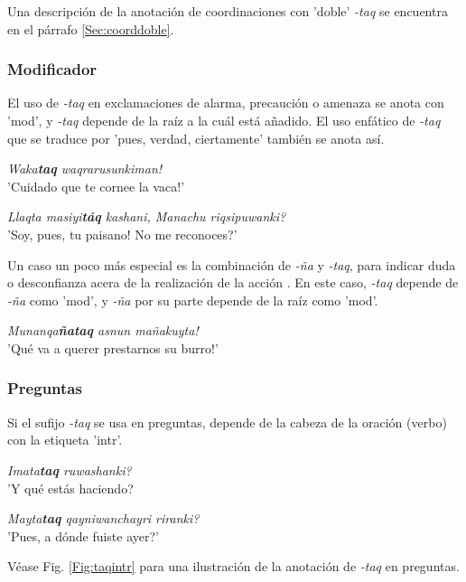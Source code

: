 \documentclass[a4paper,11pt,DIV12]{scrartcl}
\begin{document}
Una descripci\'on de la anotaci\'on de coordinaciones con 'doble' {\em -taq} se encuentra en el p\'arrafo \ref{Sec:coorddoble}.

\subsubsection{Modificador}\label{Sec:taqmod}
El uso de {\em -taq} en exclamaciones de alarma, precauci\'on o amenaza se anota con 'mod', y {\em -taq} depende de la ra\'iz a la cu\'al est\'a a\~nadido. El uso enf\'atico de {\em -taq} que se traduce por 'pues, verdad, ciertamente' tambi\'en se anota as\'i.
\begin{examples}
 \item {\em Waka\textbf{taq} waqrarusunkiman!}\\
      '{\textexclamdown}Cuidado que te cornee la vaca!'
 \item {\em Llaqta masiyi\textbf{t\'aq} kashani, {\textquestiondown}Manachu riqsipuwanki?}\\
      '{\textexclamdown}Soy, pues, tu paisano! {\textquestiondown}No me reconoces?'\\
 		\hfill{\small \citep[241-242]{Cusi2}}
\end{examples}

Un caso un poco m\'as especial es la combinaci\'on de {\em -\~na} y {\em -taq}, para indicar duda o desconfianza acera de la realizaci\'on de la acci\'on \citep[248]{Cusi2}. En este caso, {\em -taq} depende de {\em -\~na} como 'mod', y {\em -\~na} por su parte depende de la ra\'iz como 'mod'.
\begin{examples}
 \item {\em Munanqa\textbf{\~nataq} asnun ma\~nakuyta!}\\
      '{\textexclamdown}Qu\'e va a querer prestarnos su burro!'
\end{examples}

\subsubsection{Preguntas}
Si el sufijo {\em -taq} se usa en preguntas, depende de la cabeza de la oraci\'on (verbo) con la etiqueta 'intr'. 

\begin{examples}
 \item {\em Imata\textbf{taq} ruwashanki?}\\
      '{\textquestiondown}Y qu\'e est\'as haciendo?
  \item {\em Mayta\textbf{taq} qayniwanchayri riranki?}\\
      '{\textquestiondown}Pues, a d\'onde fuiste ayer?'\\
 		\hfill{\small \citep[241]{Cusi2}}
\end{examples}
V\'ease Fig. \ref{Fig:taqintr} para una ilustraci\'on de la anotaci\'on de {\em -taq} en preguntas.
\end{document}
